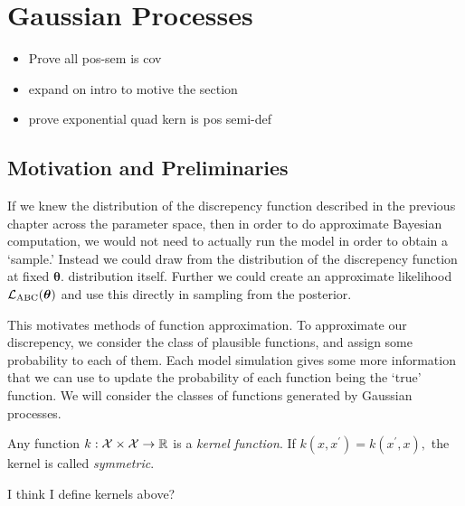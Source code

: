 \chapter{Gaussian Processes}

\begin{itemize}
    \item Prove all pos-sem is cov
    \item expand on intro to motive the section
    \item prove exponential quad kern is pos semi-def
\end{itemize}

\section{Motivation and Preliminaries}

If we knew the distribution of the discrepency function described in the previous chapter across the parameter space, then in order to do approximate Bayesian computation, we would not need to actually run the model in order to obtain a `sample.' Instead we could draw from the distribution of the discrepency function at fixed $\bm\theta.$ distribution itself. Further we could create an approximate likelihood $\mathcal{L}_\text{ABC}(\bm\theta)$ and use this directly in sampling from the posterior.

This motivates methods of function approximation. To approximate our discrepency, we consider the class of plausible functions, and assign some probability to each of them. Each model simulation gives some more information that we can use to update the probability of each function being the `true' function. We will consider the classes of functions generated by Gaussian processes.

\color{red}
\begin{definition}\label{def:kernel}
    Any function $k:\mathcal{X}\times\mathcal{X}\to\mathbb{R}$ is a
    \emph{kernel function}. If $k(x, x^\prime) = k(x^\prime, x),$ the kernel is
    called \emph{symmetric}.
\end{definition}

I think I define kernels above?

\color{black}


